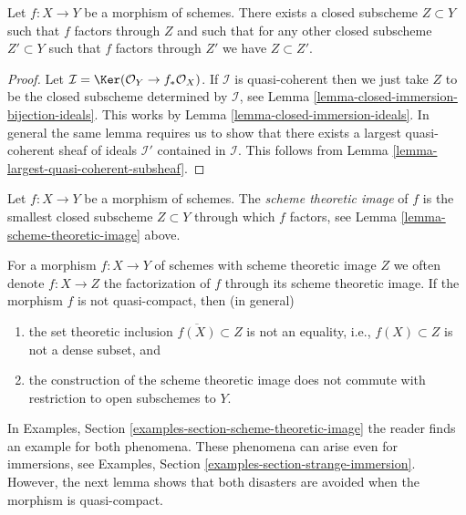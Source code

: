 \begin{lemma}
\label{lemma-scheme-theoretic-image}
Let $f : X \to Y$ be a morphism of schemes. There exists a closed
subscheme $Z \subset Y$ such that $f$ factors through $Z$ and such
that for any other closed subscheme $Z' \subset Y$ such that $f$
factors through $Z'$ we have $Z \subset Z'$.
\end{lemma}

\begin{proof}
Let $\mathcal{I} = \Ker(\mathcal{O}_Y \to f_*\mathcal{O}_X)$.
If $\mathcal{I}$ is quasi-coherent then we just take $Z$ to be the
closed subscheme determined by $\mathcal{I}$, see
Lemma \ref{lemma-closed-immersion-bijection-ideals}. This works by
Lemma \ref{lemma-closed-immersion-ideals}.
In general the same lemma requires us to show that there exists
a largest quasi-coherent sheaf of ideals $\mathcal{I}'$ contained in
$\mathcal{I}$.
This follows from Lemma \ref{lemma-largest-quasi-coherent-subsheaf}.
\end{proof}

\begin{definition}
\label{definition-scheme-theoretic-image}
Let $f : X \to Y$ be a morphism of schemes. The {\it scheme theoretic image}
of $f$ is the smallest closed subscheme $Z \subset Y$ through which $f$
factors, see Lemma \ref{lemma-scheme-theoretic-image} above.
\end{definition}

\noindent
For a morphism $f : X \to Y$ of schemes with scheme theoretic image $Z$
we often denote $f : X \to Z$ the factorization of $f$
through its scheme theoretic image. If the morphism $f$ is not
quasi-compact, then (in general)
\begin{enumerate}
\item the set theoretic inclusion $\overline{f(X)} \subset Z$
is not an equality, i.e., $f(X) \subset Z$ is not a dense subset, and
\item the construction of the scheme theoretic image does not commute with
restriction to open subschemes to $Y$.
\end{enumerate}
In Examples, Section \ref{examples-section-scheme-theoretic-image}
the reader finds an example for both phenomena.
These phenomena can arise even for immersions, see
Examples, Section \ref{examples-section-strange-immersion}.
However, the next lemma shows that both disasters are avoided
when the morphism is quasi-compact.

